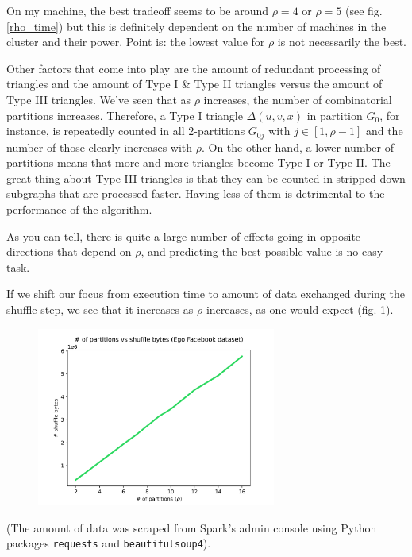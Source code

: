 \documentclass[paper=a4, fontsize=11pt]{scrartcl}
\begin{document}
On my machine, the best tradeoff seems to be around $\rho=4$ or $\rho=5$ (see
fig. \ref{rho_time}) but this is definitely dependent on the number of machines
in the cluster and their power. Point is: the lowest value for $\rho$ is not
necessarily the best.

Other factors that come into play are the amount of redundant processing of
triangles and the amount of Type I \& Type II triangles versus the amount of
Type III triangles. We've seen that as $\rho$ increases, the number of
combinatorial partitions increases. Therefore, a Type I triangle $\Delta(u,v,x)$
in partition $G_0$, for instance, is repeatedly counted in all 2-partitions
$G_{0j}$ with $j\in[1,\rho-1]$ and the number of those clearly increases with
$\rho$. On the other hand, a lower number of partitions means that more and more
triangles become Type I or Type II. The great thing about Type III triangles is
that they can be counted in stripped down subgraphs that are processed faster.
Having less of them is detrimental to the performance of the algorithm.

As you can tell, there is quite a large number of effects going in opposite
directions that depend on $\rho$, and predicting the best possible value is no
easy task.

If we shift our focus from execution time to amount of data exchanged during the
shuffle step, we see that it increases as $\rho$ increases, as one would expect
(fig. \ref{rho_data}).

\begin{figure}[htb]
    \centering
    \includegraphics[width=0.7\textwidth]{img/rho_data}
    \caption{} \label{rho_data}
\end{figure}

(The amount of data was scraped from Spark's admin console using Python packages
\texttt{requests} and \texttt{beautifulsoup4}).
\end{document}
